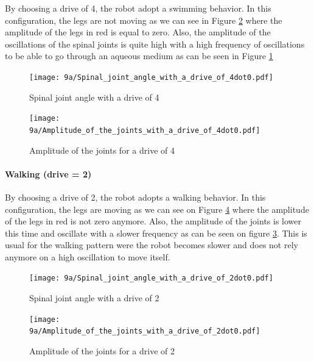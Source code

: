 \documentclass{cmc}
\begin{document}
By choosing a drive of 4, the robot adopt a swimming behavior. In this configuration, the legs are not moving as we can see in Figure \ref{fig_ampli_4} where the amplitude of the legs in red is equal to zero. Also, the amplitude of the oscillations of the spinal joints is quite high with a high frequency of oscillations to be able to go through an aqueous medium as can be seen in Figure \ref{fig_spinal_4}

\begin{minipage}[c]{.48\linewidth}
\begin{figure}[H]
    \centering
    \texttt{[image: 9a/Spinal\_joint\_angle\_with\_a\_drive\_of\_4dot0.pdf]}
    \caption{Spinal joint angle with a drive of 4}
    \label{fig_spinal_4}
\end{figure}

\end{minipage}
\hfill
\begin{minipage}[c]{.48\linewidth}
\begin{figure}[H]
    \centering
    \texttt{[image: 9a/Amplitude\_of\_the\_joints\_with\_a\_drive\_of\_4dot0.pdf]}
    \caption{Amplitude of the joints for a drive of 4}
    \label{fig_ampli_4}
\end{figure}

\end{minipage}

\paragraph{Walking (drive = 2)}

By choosing a drive of 2, the robot adopts a walking behavior. In this configuration, the legs are moving as we can see on Figure \ref{fig_ampli_2} where the amplitude of the legs in red is not zero anymore. Also, the amplitude of the joints is lower this time and oscillate with a slower frequency as can be seen on figure \ref{fig_spinal_2}. This is usual for the walking pattern were the robot becomes slower and does not rely anymore on a high oscillation to move itself.

\begin{minipage}[c]{.48\linewidth}
\begin{figure}[H]
    \centering
    \texttt{[image: 9a/Spinal\_joint\_angle\_with\_a\_drive\_of\_2dot0.pdf]}
    \caption{Spinal joint angle with a drive of 2}
    \label{fig_spinal_2}
\end{figure}

\end{minipage}
\hfill
\begin{minipage}[c]{.48\linewidth}
\begin{figure}[H]
    \centering
    \texttt{[image: 9a/Amplitude\_of\_the\_joints\_with\_a\_drive\_of\_2dot0.pdf]}
    \caption{Amplitude of the joints for a drive of 2}
    \label{fig_ampli_2}
\end{figure}

\end{minipage}
\end{document}
